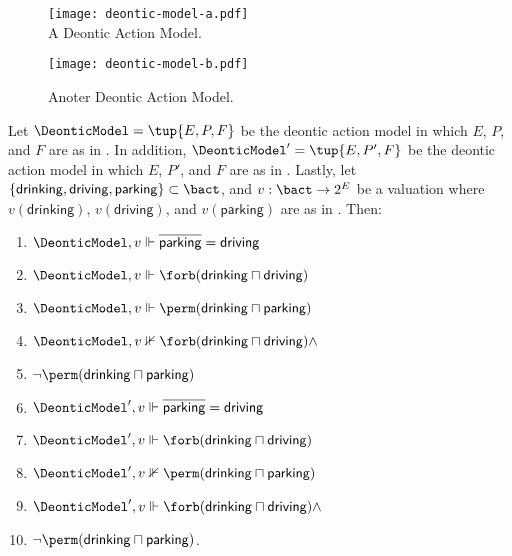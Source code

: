 \begin{example}\label{ex:semantics}
   \begin{figure}
      \centering
      \begin{minipage}{0.5\textwidth}
            \centering
            \texttt{[image: deontic-model-a.pdf]}\\[1em] %
            \caption{A Deontic Action Model.}\label{ex:deontic:model:a}
      \end{minipage}\hfill
      \begin{minipage}{0.5\textwidth}
            \centering
            \texttt{[image: deontic-model-b.pdf]}\\[1em] %
            \caption{Anoter Deontic Action Model.}\label{ex:deontic:model:b}
      \end{minipage}
   \end{figure}
   Let $\DeonticModel = \tup{E,P,F}$ be the deontic action model in which $E$, $P$, and $F$ are as in .
   In addition, $\DeonticModel' = \tup{E,P',F}$ be the deontic action model in which $E$, $P'$, and $F$ are as in .
   Lastly, let $\{\mathsf{drinking}, \mathsf{driving}, \mathsf{parking}\} \subset \bact$, and $v: \bact \to 2^E$ be a valuation where $v(\mathsf{drinking})$, $v(\mathsf{driving})$, and $v(\mathsf{parking})$ are as in .
   Then:


   \begin{multicols}{2}
   \begin{enumerate}
      \item $\DeonticModel, v \Vdash \overline{\mathsf{parking}} = \mathsf{driving}$
      \item $\DeonticModel, v \Vdash \forb(\mathsf{drinking} \sqcap \mathsf{driving})$
      \item $\DeonticModel, v \Vdash \perm(\mathsf{drinking} \sqcap \mathsf{parking})$
      \item $\DeonticModel, v \nVdash \forb(\mathsf{drinking} \sqcap \mathsf{driving}) \land$
      \item[] \hspace{1.9cm}$\lnot\perm(\mathsf{drinking} \sqcap \mathsf{parking})$
      \item $\DeonticModel', v \Vdash \overline{\mathsf{parking}} = \mathsf{driving}$
      \item $\DeonticModel', v \Vdash \forb(\mathsf{drinking} \sqcap \mathsf{driving})$
      \item $\DeonticModel', v \nVdash \perm(\mathsf{drinking} \sqcap \mathsf{parking})$
      \item $\DeonticModel', v \Vdash \forb(\mathsf{drinking} \sqcap \mathsf{driving}) \land$
      \item[] \hspace{1.9cm}$\lnot\perm(\mathsf{drinking} \sqcap \mathsf{parking})$.
   \end{enumerate}
   \end{multicols}


\end{example}
